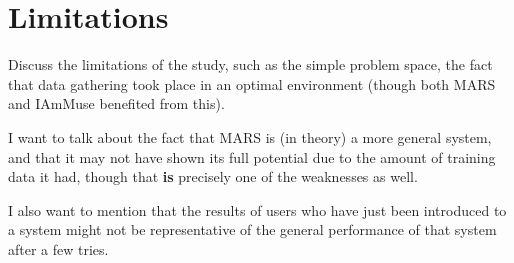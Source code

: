 
\section{Limitations}
\label{section: discussion - limitations}

Discuss the limitations of the study, such as the simple problem space, the fact that data gathering took place in an optimal environment (though both MARS and IAmMuse benefited from this).

I want to talk about the fact that MARS is (in theory) a more general system, and that it may not have shown its full potential due to the amount of training data it had, though that \textbf{is} precisely one of the weaknesses as well.

I also want to mention that the results of users who have just been introduced to a system might not be representative of the general performance of that system after a few tries.